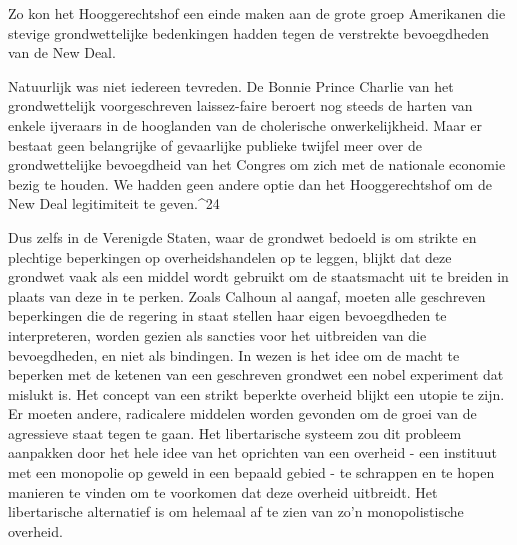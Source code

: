 \documentclass[
  a5paper,
  smalldemyvopaper,10pt,twoside,onecolumn,openright,extrafontsizes,hidelinks]{memoir}
\renewenvironment{quote}%
               {\list{}{\rightmargin=.6cm\leftmargin=.6cm}%
                \itshape \item[]}%
               {\endlist}
\begin{document}
Zo kon het Hooggerechtshof een einde maken aan de grote groep Amerikanen
die stevige grondwettelijke bedenkingen hadden tegen de verstrekte
bevoegdheden van de New Deal.

\begin{quote}
Natuurlijk was niet iedereen tevreden. De Bonnie Prince Charlie van het
grondwettelijk voorgeschreven laissez-faire beroert nog steeds de harten
van enkele ijveraars in de hooglanden van de cholerische
onwerkelijkheid. Maar er bestaat geen belangrijke of gevaarlijke
publieke twijfel meer over de grondwettelijke bevoegdheid van het
Congres om zich met de nationale economie bezig te houden. We hadden
geen andere optie dan het Hooggerechtshof om de New Deal legitimiteit te
geven.\^{}24
\end{quote}

Dus zelfs in de Verenigde Staten, waar de grondwet bedoeld is om strikte
en plechtige beperkingen op overheidshandelen op te leggen, blijkt dat
deze grondwet vaak als een middel wordt gebruikt om de staatsmacht uit
te breiden in plaats van deze in te perken. Zoals Calhoun al aangaf,
moeten alle geschreven beperkingen die de regering in staat stellen haar
eigen bevoegdheden te interpreteren, worden gezien als sancties voor het
uitbreiden van die bevoegdheden, en niet als bindingen. In wezen is het
idee om de macht te beperken met de ketenen van een geschreven grondwet
een nobel experiment dat mislukt is. Het concept van een strikt beperkte
overheid blijkt een utopie te zijn. Er moeten andere, radicalere
middelen worden gevonden om de groei van de agressieve staat tegen te
gaan. Het libertarische systeem zou dit probleem aanpakken door het hele
idee van het oprichten van een overheid - een instituut met een
monopolie op geweld in een bepaald gebied - te schrappen en te hopen
manieren te vinden om te voorkomen dat deze overheid uitbreidt. Het
libertarische alternatief is om helemaal af te zien van zo'n
monopolistische overheid.
\end{document}
